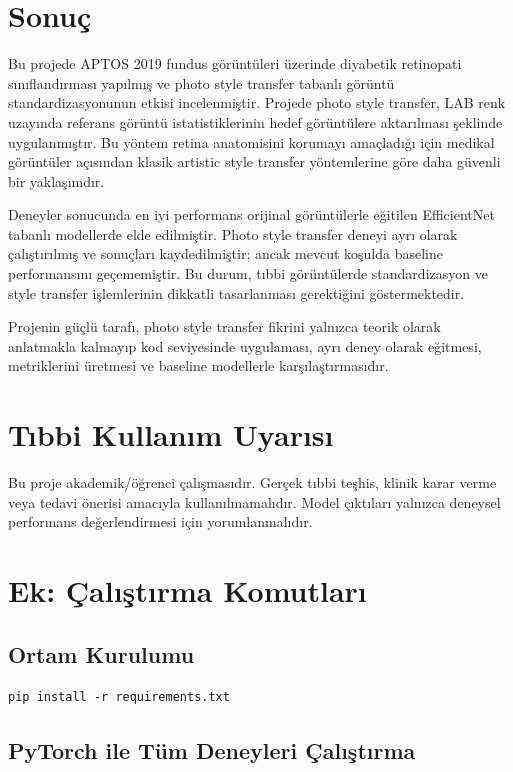 \documentclass[12pt,a4paper]{article}
\begin{document}
\section{Sonuç}

Bu projede APTOS 2019 fundus görüntüleri üzerinde diyabetik retinopati sınıflandırması yapılmış ve photo style transfer tabanlı görüntü standardizasyonunun etkisi incelenmiştir. Projede photo style transfer, LAB renk uzayında referans görüntü istatistiklerinin hedef görüntülere aktarılması şeklinde uygulanmıştır. Bu yöntem retina anatomisini korumayı amaçladığı için medikal görüntüler açısından klasik artistic style transfer yöntemlerine göre daha güvenli bir yaklaşımdır.

Deneyler sonucunda en iyi performans orijinal görüntülerle eğitilen EfficientNet tabanlı modellerde elde edilmiştir. Photo style transfer deneyi ayrı olarak çalıştırılmış ve sonuçları kaydedilmiştir; ancak mevcut koşulda baseline performansını geçememiştir. Bu durum, tıbbi görüntülerde standardizasyon ve style transfer işlemlerinin dikkatli tasarlanması gerektiğini göstermektedir.

Projenin güçlü tarafı, photo style transfer fikrini yalnızca teorik olarak anlatmakla kalmayıp kod seviyesinde uygulaması, ayrı deney olarak eğitmesi, metriklerini üretmesi ve baseline modellerle karşılaştırmasıdır.

\section*{Tıbbi Kullanım Uyarısı}

Bu proje akademik/öğrenci çalışmasıdır. Gerçek tıbbi teşhis, klinik karar verme veya tedavi önerisi amacıyla kullanılmamalıdır. Model çıktıları yalnızca deneysel performans değerlendirmesi için yorumlanmalıdır.

\appendix
\section{Ek: Çalıştırma Komutları}

\subsection{Ortam Kurulumu}

\begin{verbatim}
pip install -r requirements.txt
\end{verbatim}

\subsection{PyTorch ile Tüm Deneyleri Çalıştırma}
\end{document}
